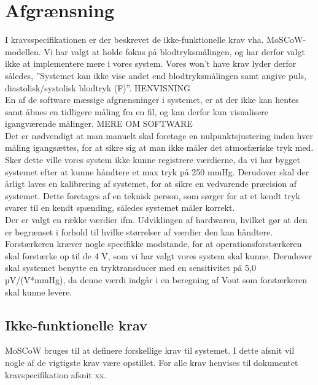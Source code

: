 \section{Afgrænsning}
I kravsspecifikationen er der beskrevet de ikke-funktionelle krav vha. MoSCoW- modellen. Vi har valgt at holde fokus på blodtryksmålingen, og har derfor valgt ikke at implementere mere i vores system. Vores won’t have krav lyder derfor således,
”Systemet kan ikke vise andet end blodtryksmålingen samt angive puls, diastolisk/systolisk blodtryk (F)”. HENVISNING\\

En af de software mæssige afgrænsninger i systemet, er at der ikke kan hentes samt åbnes en tidligere måling fra en fil, og kan derfor kun visualisere igangværende målinger. MERE OM SOFTWARE\\

Det er nødvendigt at man manuelt skal foretage en nulpunktsjustering inden hver måling igangsættes, for at sikre sig at man ikke måler det atmosfæriske tryk med. Sker dette ville vores system ikke kunne registrere værdierne, da vi har bygget systemet efter at kunne håndtere et max tryk på 250 mmHg. Derudover skal der årligt laves en kalibrering af systemet, for at sikre en vedvarende præcision af systemet. Dette foretages af en teknisk person, som sørger for at et kendt tryk svarer til en kendt spænding, således systemet måler korrekt.\\

Der er valgt en række værdier ifm. Udviklingen af hardwaren, hvilket gør at den er begrænset i forhold til hvilke størrelser af værdier den kan håndtere. Forstærkeren kræver nogle specifikke modstande, for at operationsforstærkeren skal forstærke op til de 4 V, som vi har valgt vores system skal kunne. Derudover skal systemet benytte en tryktransducer med en sensitivitet på 5,0 µV/(V*mmHg), da denne værdi indgår i en beregning af Vout som forstærkeren skal kunne levere.

\subsection{Ikke-funktionelle krav}
\vspace{0.3 cm}
MoSCoW bruges til at definere forskellige krav til systemet. I dette afsnit vil nogle af de vigtigste krav være opstillet. For alle krav henvises til dokumentet kravspecifikation afsnit xx. 

